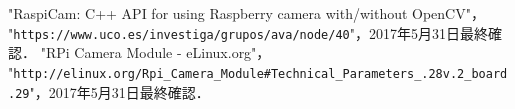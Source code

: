 \documentclass[11pt,a4paper]{jsarticle}
\begin{document}
\begin{thebibliography}{9}
    "RaspiCam: C++ API for using Raspberry camera with/without OpenCV"，\\
    "\texttt{https://www.uco.es/investiga/grupos/ava/node/40}"，2017年5月31日最終確認．
    "RPi Camera Module - eLinux.org"，\\
    "\texttt{http://elinux.org/Rpi\_Camera\_Module\#Technical\_Parameters\_.28v.2\_board.29}"，2017年5月31日最終確認．
\end{thebibliography}
\end{document}
